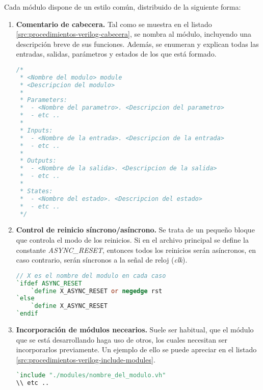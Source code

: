 Cada módulo dispone de un estilo común, distribuido de la siguiente forma:

\begin{enumerate}
    \item{\textbf{Comentario de cabecera.}} Tal como se muestra en el listado \ref{src:procedimientos-verilog-cabecera}, se nombra al módulo, incluyendo una descripción breve de sus funciones. Además, se enumeran y explican todas las entradas, salidas, parámetros y estados de los que está formado.
    \begin{lstlisting}[language=Verilog,
        caption={Ejemplo de comentario de cabecera del módulo.},
        label=src:procedimientos-verilog-cabecera]
/*
 * <Nombre del modulo> module
 * <Descripcion del modulo>
 *
 * Parameters:
 *  - <Nombre del parametro>. <Descripcion del parametro>
 *  - etc ..
 *
 * Inputs:
 *  - <Nombre de la entrada>. <Descripcion de la entrada>
 *  - etc ..
 *
 * Outputs:
 *  - <Nombre de la salida>. <Descripcion de la salida>
 *  - etc ..
 *
 * States:
 *  - <Nombre del estado>. <Descripcion del estado>
 *  - etc ..
 */
    \end{lstlisting}

    \item{\textbf{Control de reinicio síncrono/asíncrono.}} Se trata de un pequeño bloque que controla el modo de los reinicios. Si en el archivo principal se define la constante \emph{ASYNC\_RESET}, entonces todos los reinicios serán asíncronos, en caso contrario, serán síncronos a la señal de reloj (\emph{clk}).
    \begin{lstlisting}[language=Verilog,
        caption={Ejemplo de control de reinicio síncrono/asíncrono.},
        label=src:procedimientos-verilog-sync]
// X es el nombre del modulo en cada caso
`ifdef ASYNC_RESET
    `define X_ASYNC_RESET or negedge rst
`else
    `define X_ASYNC_RESET
`endif
    \end{lstlisting}
        
    \item{\textbf{Incorporación de módulos necearios.}} Suele ser habitual, que el módulo que se está desarrollando haga uso de otros, los cuales necesitan ser incorporarlos previamente. Un ejemplo de ello se puede apreciar en el listado \ref{src:procedimientos-verilog-include-modules}.
    \begin{lstlisting}[language=Verilog,
        caption={Ejemplo de incorporación de módulos.},
        label=src:procedimientos-verilog-include-modules]
`include "./modules/nombre_del_modulo.vh"
\\ etc ..
    \end{lstlisting}
        

\end{enumerate}
